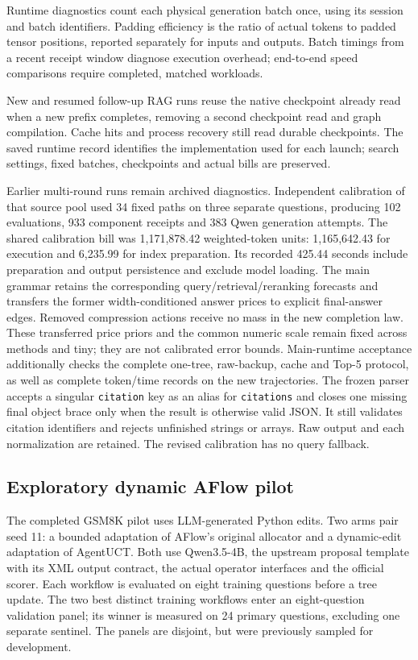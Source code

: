 Runtime diagnostics count each physical generation batch once, using its
session and batch identifiers. Padding efficiency is the ratio of actual
tokens to padded tensor positions, reported separately for inputs and outputs.
Batch timings from a recent receipt window diagnose execution overhead;
end-to-end speed comparisons require completed, matched workloads.

New and resumed follow-up RAG runs reuse the native checkpoint already read
when a new prefix completes, removing a second checkpoint read and graph
compilation. Cache hits and process recovery still read durable checkpoints.
The saved runtime record identifies the implementation used for each launch;
search settings, fixed batches, checkpoints and actual bills are preserved.

Earlier multi-round runs remain archived diagnostics. Independent calibration
of that source pool used 34 fixed paths on three separate questions, producing
102 evaluations, 933 component receipts and 383 Qwen generation attempts.
The shared calibration bill was 1,171,878.42 weighted-token units:
1,165,642.43 for execution and 6,235.99 for index preparation. Its recorded
425.44 seconds include preparation and output persistence and exclude model
loading. The main grammar retains the
corresponding query/retrieval/reranking forecasts and transfers the former
width-conditioned answer prices to explicit final-answer edges. Removed
compression actions receive no mass in the new completion law. These transferred
price priors and the common numeric scale remain fixed across methods and tiny;
they are not calibrated error bounds. Main-runtime acceptance additionally
checks the complete one-tree, raw-backup, cache and Top-5 protocol, as well as
complete token/time records on the new trajectories.
The frozen parser accepts a singular \texttt{citation} key as an alias for
\texttt{citations} and closes one missing final object brace only when the
result is otherwise valid JSON. It still validates citation identifiers and
rejects unfinished strings or arrays. Raw output and each normalization are
retained. The revised calibration has no query fallback.

\subsection{Exploratory dynamic AFlow pilot}
The completed GSM8K pilot uses LLM-generated Python edits. Two arms pair seed 11: a bounded adaptation of AFlow's
original allocator and a dynamic-edit adaptation of AgentUCT. Both use
Qwen3.5-4B, the upstream proposal template with its XML output contract,
the actual operator interfaces and the official scorer. Each workflow is
evaluated on eight training questions before a tree update. The two best
distinct training workflows enter an eight-question validation panel; its
winner is measured on 24 primary questions, excluding one separate sentinel.
The panels are disjoint, but were previously sampled for development.

